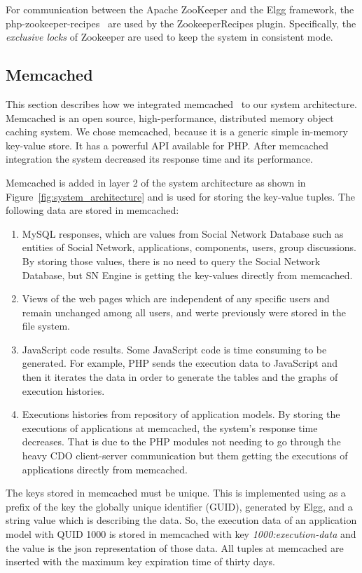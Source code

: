 For communication between the Apache ZooKeeper and the Elgg framework, the php-zookeeper-recipes~\cite{zookeeper_recipes_url} are used by the ZookeeperRecipes plugin. Specifically, the {\it exclusive locks} of Zookeeper are used to keep the system in consistent mode.

\subsection{Memcached}
\label{sec:memcache_implementation}
This section describes how we integrated memcached~\cite{memcache_url} to our system architecture. Memcached is an open source, high-performance, distributed memory object caching system. We chose memcached, because it is a generic simple in-memory key-value store. It has a powerful API available for PHP. After memcached integration the system decreased its response time and its performance.

Memcached is added in layer 2 of the system architecture as shown in Figure~\ref{fig:system_architecture} and is used for storing the key-value tuples. The following data are stored in memcached: 
\begin{enumerate}
\item MySQL responses, which are values from Social Network Database such as entities of Social Network, applications, components, users, group discussions. By storing those values, there is no need to query the Social Network Database, but SN Engine is getting the key-values directly from memcached.
\item Views of the web pages which are independent of any specific users and remain unchanged among all users, and werte previously were stored in the file system.
\item JavaScript code results. Some JavaScript code is time consuming to be generated. For example, PHP sends the execution data to JavaScript and then it iterates the data in order to generate the tables and the graphs of execution histories.
\item Executions histories from repository of application models. By storing the executions of applications at memcached, the system's response time decreases. That is due to the PHP modules not needing to go through the heavy CDO client-server communication but them getting the executions of applications directly from memcached.
\end{enumerate}

The keys stored in memcached must be unique. This is implemented using as a prefix of the key the globally unique identifier (GUID), generated by Elgg, and a string value which is describing the data. So, the execution data of an application model with QUID 1000 is stored in memcached with key {\it 1000:execution-data} and the value is the json representation of those data. All tuples at memcached are inserted with the maximum key expiration time of thirty days.

